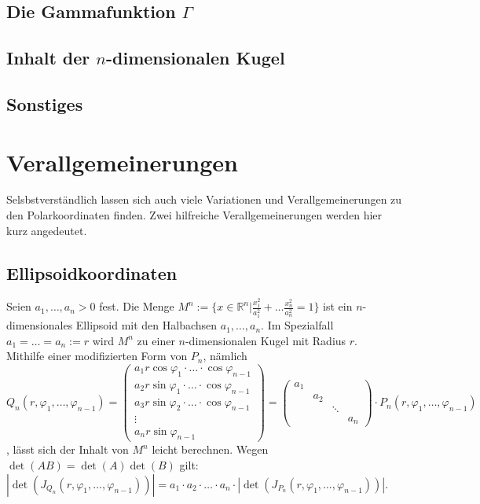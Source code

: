 \documentclass[a4paper,11pt]{report}
\theoremstyle{definition}
\newcommand{\R}{{\ensuremath{\mathbb{R}}}}
\begin{document}
\section{Die Gammafunktion $\Gamma$}

\section{Inhalt der $n$-dimensionalen Kugel}
\section{Sonstiges}%
\chapter{Verallgemeinerungen}
Selsbstverständlich lassen sich auch viele Variationen und Verallgemeinerungen zu den Polarkoordinaten finden. Zwei hilfreiche Verallgemeinerungen werden hier kurz angedeutet.
\section{\glqq Ellipsoidkoordinaten\grqq}%
Seien $a_1,\ldots,a_n>0$ fest. Die Menge $M^n:=\{x\in\R^n|\frac{x_1^2}{a_1^2}+\ldots\frac{x_n^2}{a_n^2}=1\}$ ist ein $n$-dimensionales Ellipsoid mit den Halbachsen $a_1,\ldots,a_n$. Im Spezialfall $a_1=\ldots=a_n:=r$ wird $M^n$ zu einer $n$-dimensionalen Kugel mit Radius $r$.\\
Mithilfe einer modifizierten Form von $P_n$, nämlich\\ $Q_n(r,\varphi_1,\ldots,\varphi_{n-1})=\begin{pmatrix}a_1r\cos\varphi_1\cdot\ldots\cdot\cos\varphi_{n-1} \\ a_2r\sin\varphi_1\cdot\ldots\cdot\cos\varphi_{n-1} \\
a_3r\sin\varphi_2\cdot\ldots\cdot\cos\varphi_{n-1} \\
\vdots \\
a_nr \sin\varphi_{n-1}
\end{pmatrix}=\begin{pmatrix}a_1 & & & \\ & a_2 & & \\ & & \ddots & \\ & & & a_n\end{pmatrix}\cdot P_n(r,\varphi_1,\ldots,\varphi_{n-1})$,
lässt sich der Inhalt von $M^n$ leicht berechnen. Wegen $\det(AB)=\det(A)\det(B)$ gilt:\\
$|\det(J_{Q_n}(r,\varphi_1,\ldots,\varphi_{n-1}))|=
a_1\cdot a_2\cdot\ldots\cdot a_n\cdot|\det(J_{P_n}(r,\varphi_1,\ldots,\varphi_{n-1}))|$.
\end{document}
